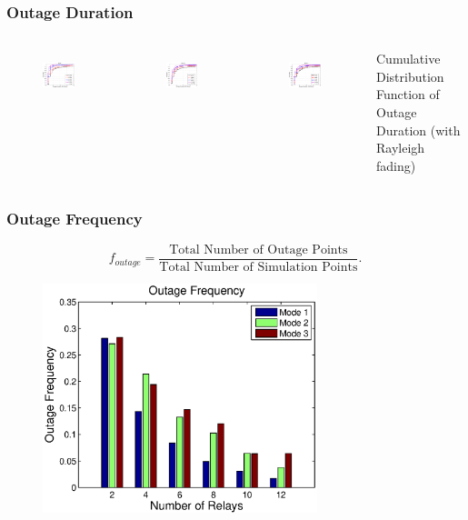 \documentclass{beamer}
\begin{document}
\begin{frame}
\frametitle{Outage Duration}
\begin{columns}[c]
\begin{figure}
\includegraphics[width=4.5cm]{OutageDuration_Rayleigh_Mode1_V2.eps}
\label{Mode1}
\end{figure}
\begin{figure}
\includegraphics[width=4.5cm]{OutageDuration_Rayleigh_Mode2_V2.eps}
\label{Mode2}
\end{figure}
\begin{figure}
\includegraphics[width=4.5cm]{OutageDuration_Rayleigh_Mode3_V2.eps}
\label{Mode3}
\end{figure}
Cumulative Distribution Function of Outage Duration (with Rayleigh fading)
\end{columns}
\end{frame}

\begin{frame}
\frametitle{Outage Frequency}
\begin{equation}
f_{outage}=\frac{\text{Total Number of Outage Points}}{\text{Total Number of Simulation Points}}.
\end{equation}
\begin{figure}
\centering
\includegraphics[width=8cm]{outagefrequency_V2.eps}
\label{outagefrequency}
\end{figure}
\end{frame}
%
\end{document}
